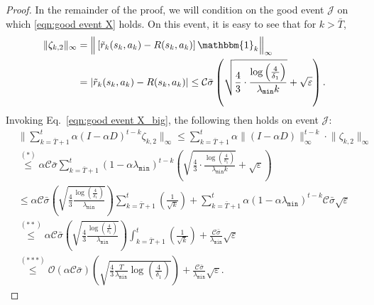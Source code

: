 \documentclass{article}
\newcommand{\mc}{\mathcal}
\begin{document}
\begin{proof}
In the remainder of the proof, we will condition on the good event $\mc{J}$ on which \eqref{eqn:good event X} holds. On this event, it is easy to see that for $k > \bar{T}$, 
\begin{equation}\label{eqn:good event X_big}
\begin{aligned}
    \lVert \zeta_{k,2} \rVert_{\infty} &= \Big \lVert \left[\tilde{r}_k(s_k,a_k) - R(s_k, a_k)\right] \mathbbm{1}_k \Big \rVert_{\infty} \\  & = \left| \tilde{r}_k(s_k, a_k) - R(s_k, a_k) \right| \leq \mc{C} \bar{\sigma} \left( 
            \sqrt{ \frac{4}{3} \cdot \frac{ \log\left( \frac{4}{\delta_1} \right) }{ \lambda_{\texttt{min}} k } } 
            + \sqrt{\varepsilon} \right).
\end{aligned}
\end{equation}
Invoking Eq.~\eqref{eqn:good event X_big}, the following then holds on event $\mc{J}$: 
\begin{equation}\label{eqn:bound_2}
\begin{aligned}
    &\bigg\lVert \sum_{k=\bar{T}+1}^{t} \alpha (I-\alpha D)^{t-k} \zeta_{k,2} \bigg\rVert_{\infty} \le \sum_{k=\bar{T}+1}^{t} \alpha \lVert (I-\alpha D)\rVert^{t-k}_{\infty} \cdot\lVert \zeta_{k,2}\rVert_{\infty}\\
    & \overset{(*)}{\le}\alpha\mc{C} \bar{\sigma}\sum_{k=\bar{T}+1}^{t}(1-\alpha\lambda_{\texttt{min}})^{t-k} \left(\sqrt{ \frac{4}{3} \cdot \frac{ \log\left( \frac{4}{\delta_1} \right) }{ \lambda_{\texttt{min}} k } } 
            + \sqrt{\varepsilon} \right) \\
    & \overset{}{\le}  \alpha \mc{C}\bar{\sigma}\left(\sqrt{\frac{4}{3}\frac{\log\left(\frac{4}{\delta_1}\right)}{\lambda_{\texttt{min}}}}\right) \sum_{k=\bar{T}+1}^{t}\left(\frac{1}{\sqrt{k}}\right) + \sum_{k=\bar{T}+1}^{t} \alpha(1-\alpha \lambda_{\texttt{min}})^{t-k}\mc{C}\bar{\sigma}\sqrt{\varepsilon}\\
     & \overset{(**)}{\le}  \alpha \mc{C}\bar{\sigma}\left(\sqrt{\frac{4}{3}\frac{\log\left(\frac{4}{\delta_1}\right)}{\lambda_{\texttt{min}}}}\right) \int_{k=\bar{T}+1}^{t}\left(\frac{1}{\sqrt{k}}\right) + \frac{\mc{C}\bar{\sigma}}{\lambda_{\texttt{min}}}\sqrt{\varepsilon}\\
    & \overset{(***)}{\le}\mc{O}(\alpha \mc{C}\bar{\sigma})\left(\sqrt{\frac{4}{3}\frac{T}{\lambda_{\texttt{min}}}\log\left(\frac{4}{\delta_1}\right)}\right) + \frac{\mc{C}\bar{\sigma}}{\lambda_{\texttt{min}}}\sqrt{\varepsilon}.
    \end{aligned}
\end{equation}

\end{proof}
\end{document}
